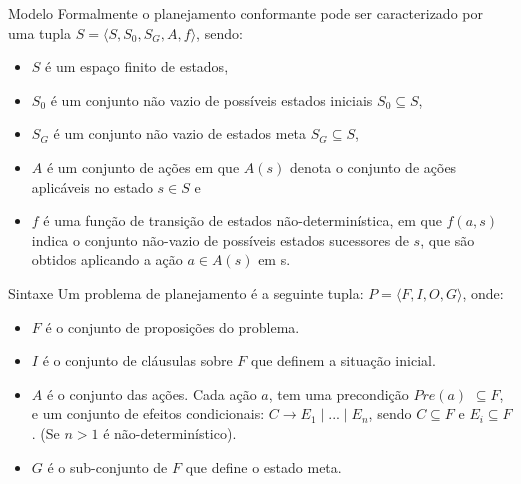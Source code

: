 % 
% 


\begin{frame}{Modelo}
Formalmente o planejamento conformante pode ser caracterizado por uma tupla 
$S=\langle S, S_0, S_G, A, f \rangle$, sendo:
\begin{itemize}
\item $S$ é um espaço finito de estados,
\item $S_0$ é um conjunto não vazio de possíveis estados iniciais $S_0\subseteq 
S$,
\item $S_G$ é um conjunto não vazio de estados meta $S_G \subseteq S$,
\item $A$ é um conjunto de ações em que $A(s)$ denota o conjunto de ações 
aplicáveis no estado $s \in S$ e
\item $f$ é uma função de transição de estados não-determinística, em que 
$f(a,s)$ indica o conjunto não-vazio de possíveis estados sucessores de $s$, que 
são obtidos aplicando a ação $a \in A(s)$ em s.
\end{itemize}
\end{frame}


\begin{frame}{Sintaxe}
Um problema de planejamento é a seguinte tupla: $P=\langle F, I, O, G\rangle$, 
onde:
\begin{itemize}
 \item $F$ é o conjunto de proposições do problema.
 \item $I$ é o conjunto de cláusulas sobre $F$ que definem a situação inicial.
 \item $A$ é o conjunto das ações. Cada ação $a$, tem uma precondição $Pre(a)$ 
$\subseteq F$, e um conjunto de efeitos condicionais: $C\rightarrow E_1 \mid ... 
\mid E_n$, sendo $C\subseteq F$ e $E_i \subseteq F$. (Se $n > 1$ é 
não-determinístico). 
 \item $G$ é o sub-conjunto de $F$ que define o estado meta. 
\end{itemize}

\end{frame}


